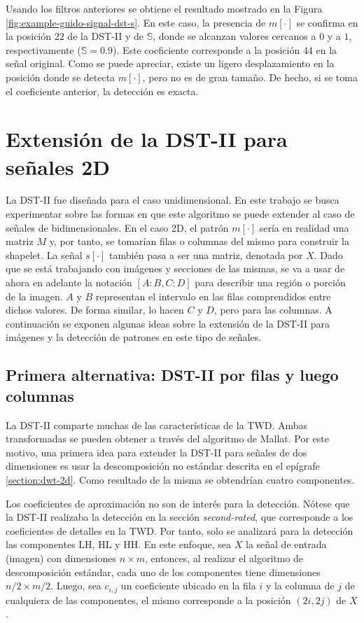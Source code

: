 Usando los filtros anteriores se obtiene el resultado mostrado en la Figura \ref{fig:example-guido-signal-dst-s}. 
En este caso, la presencia de $m[\cdot]$ se confirma en la posición $22$ de la DST-II y de $\mathbb{S}$, donde se alcanzan valores
cercanos a $0$ y a $1$, respectivamente ($\mathbb{S}=0.9$). Este coeficiente corresponde a la posición 
$44$ en la señal original. Como se puede apreciar, existe un ligero desplazamiento en la posición donde se detecta $m[\cdot]$,
pero no es de gran tamaño. De hecho, si se toma el coeficiente anterior, la detección es exacta.

\section{Extensión de la DST-II para señales 2D}\label{section:2d}

La DST-II fue diseñada para el caso unidimensional. En este trabajo se busca experimentar sobre las formas en que
este algoritmo se puede extender al caso de señales de bidimensionales. 
En el caso 2D, el patrón $m[\cdot]$ sería en realidad
una matriz $M$ y, por tanto, se tomarían filas o columnas del mismo para construir la shapelet.
La señal $s[\cdot]$ también pasa a ser una matriz, denotada por $X$.
Dado que se está trabajando con imágenes y secciones de las mismas, se va a usar de ahora en adelante la notación
$[A:B,C:D]$ para describir una región o porción de la imagen. $A$ y $B$ representan el intervalo en las filas
comprendidos entre dichos valores. De forma similar, lo hacen $C$ y $D$, pero para las columnas.
A continuación se exponen algunas ideas sobre la extensión de la DST-II para imágenes y la detección de patrones en este tipo de señales.

\subsection{Primera alternativa: DST-II por filas y luego columnas}

La DST-II comparte muchas de las características de la TWD. Ambas transformadas se pueden obtener a través del
algoritmo de Mallat. Por este motivo, una primera idea para extender la DST-II para señales de dos dimensiones
es usar la descomposición no estándar descrita en el epígrafe \ref{section:dwt-2d}.
Como resultado de la misma se obtendrían cuatro componentes. 

Los coeficientes de aproximación no son de interés para la detección. Nótese que la DST-II realizaba la detección en la sección
\textit{second-rated}, que corresponde a los coeficientes de detalles en la TWD. Por tanto, solo se analizará para
la detección las componentes LH, HL y HH.
En este enfoque, sea $X$ la señal de entrada (imagen) con dimensiones $n\times m$, entonces, al realizar el algoritmo de descomposición estándar,
cada uno de los componentes tiene dimensiones $n/2 \times m/2$. Luego, sea $c_{i,j}$ un coeficiente
ubicado en la fila $i$ y la columna de $j$ de cualquiera de las componentes, el mismo corresponde
a la posición $(2i,2j)$ de $X$.


